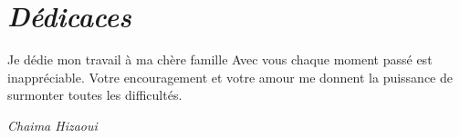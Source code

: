 \chapter*{\it Dédicaces}
\large
\begin{center}

Je dédie mon travail à ma chère famille
 \newline
Avec vous chaque moment passé est inappréciable. Votre encouragement et votre amour me donnent la puissance de surmonter toutes les difficultés.

 \end{center}
\newline

 

\newline
    \vspace{8mm}
    \begin{flushright}
        \it \LARGE{Chaima Hizaoui}
    \end{flushright}

